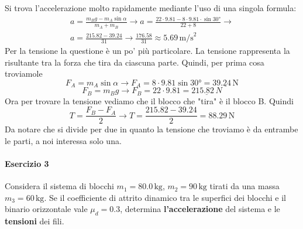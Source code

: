 Si trova l'accelerazione molto rapidamente mediante l'uso di una singola formula:
\begin{align*}
a = \frac{m_Bg - m_A\sin\alpha}{m_A+m_B} \rightarrow a =
\frac{22\cdot9.81-8\cdot9.81\cdot\sin\ang{30}}{22+8}\rightarrow\\
a = \frac{215.82 - 39.24}{31} \rightarrow \frac{176.58}{31} \approx \boxed{5.69\,\text{m/s}^2}
\end{align*}
Per la tensione la questione è un po' più particolare. La tensione rappresenta la risultante
tra la forza che tira da ciascuna parte. Quindi, per prima cosa troviamole
\begin{equation*}
F_A = m_A\sin\alpha \rightarrow F_A = 8\cdot9.81\sin\ang{30} = \underline{39.24\,\text{N}}
\end{equation*}
\begin{equation*}
F_B = m_Bg \rightarrow F_B = 22\cdot9.81 = \underline{215.82\,N}
\end{equation*}
Ora per trovare la tensione vediamo che il blocco che "tira" è il blocco B. Quindi
\begin{equation*}
T = \frac{F_B-F_A}{2} \rightarrow T = \frac{215.82-39.24}{2} = \boxed{88.29\,\text{N}}
\end{equation*}
Da notare che si divide per due in quanto la tensione che troviamo è da entrambe le parti, a noi
interessa solo una.

\paragraph{Esercizio 3}
Considera il sistema di blocchi $m_1 = 80.0\,\text{kg}$, $m_2 = 90\,\text{kg}$ tirati da una massa 
$m_3 = 60\,\text{kg}$. Se il coefficiente di attrito dinamico tra le superfici dei blocchi e il 
binario orizzontale vale $\mu_d = 0.3$, determina \textbf{l'accelerazione} del sistema e le 
\textbf{tensioni} dei fili.

\begin{center}
\end{center}
\divisor

